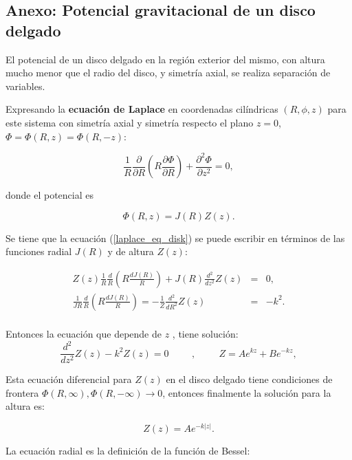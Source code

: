 \begin{appendix}
\chapter{Anexo: Potencial gravitacional de un disco delgado}\label{AnexoA}
El potencial de un disco delgado en la región exterior del mismo, con altura mucho menor que el radio del disco, y simetría axial, se realiza separación de variables.

Expresando la \textbf{ecuación de Laplace} en coordenadas cilíndricas $(R, \phi, z)$ para este sistema con simetría axial y simetría respecto el plano $z=0$, $\Phi = \Phi(R, z) = \Phi(R, -z)$:

\begin{equation}
\label{laplace_eq_disk}
\frac{1}{R} \frac{\partial }{\partial R}  \left ( R \frac{\partial \Phi }{\partial R}  \right ) + \frac{\partial^2 \Phi }{\partial z^2}  = 0,
\end{equation}

donde el potencial es

$$ \Phi(R,z) = J(R) Z(z). $$

Se tiene que la ecuación (\ref{laplace_eq_disk}) se puede escribir en términos de las funciones radial $J(R)$ y de altura $Z(z)$:

\begin{eqnarray}
   Z(z) \frac{1}{R}  \frac{d}{R} \left( R \frac{d J(R)}{R} \right) + J(R) \frac{d^2}{d z^2} Z(z) &=& 0, \\
    \frac{1}{JR} \frac{d}{R}  \left( R \frac{d J(R)}{R} \right) = -\frac{1}{Z}  \frac{d^2}{d R^2} Z(z) &=& -k^2.  \\
\end{eqnarray}

Entonces  la ecuación que depende de $z$ , tiene solución:
$$  \frac{d^2}{d z^2} Z(z)  -k^2 Z(z) = 0    \hspace{1cm}, \hspace{1cm} Z=A e^{kz} + B e^{-kz}, $$

Esta ecuación diferencial para $Z(z)$ en el disco delgado tiene condiciones de frontera $\Phi(R, \infty), \Phi(R, -\infty) \rightarrow 0$, entonces finalmente la solución para la altura es:

\begin{equation}
Z(z) = A e^{-k|z|}.
\end{equation}


La ecuación radial es la definición de la función de Bessel:


\end{appendix}
